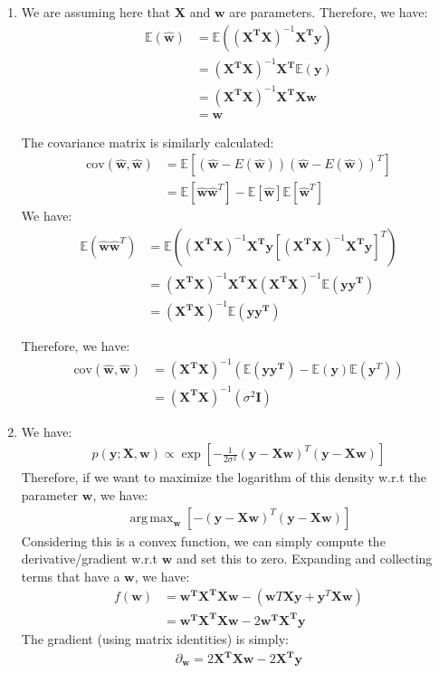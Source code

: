 \documentclass[submit]{harvardml}
\newcommand{\E}{\mathbb{E}}
\newcommand{\cov}{\text{cov}}
\renewcommand{\v}{\boldsymbol}
\DeclareMathOperator*{\argmax}{arg\,max}
\begin{document}
\begin{enumerate}[label=(\alph*)]
	\item We are assuming here that $\v{X}$ and $\v{w}$ are parameters. Therefore, we have:
		\begin{align*}
			\E(\v{\hat w}) &= \E(\v{(X^T X)}^{-1} \v{X^T y}) \\
							&= \v{(X^T X)}^{-1} \v{X^T} \E(\v{y}) \\
							&= \v{(X^T X)}^{-1} \v{X^T X} \v{w} \\
							&= \v{w}
		\end{align*}
		
		The covariance matrix is similarly calculated:
		\begin{align}
			\label{eq:cov}
			\cov( \v{\hat w},  \v{\hat w}) &= \E \left[ ( \v{\hat w} - E( \v{\hat w})) ( \v{\hat w} - E( \v{\hat w}))^T\right] \\
			&= \E \left[ \v{\hat w} \v{\hat w}^T \right] - \E \left[\v{\hat w}\right ] \E \left[ \v{\hat w}^T \right]
		\end{align}
		We have:
		\begin{align*}
			\E (\v{\hat w} \v{\hat w}^T) &= \E \left(\v{(X^T X)}^{-1} \v{X^T y} \left [ \v{(X^T X)}^{-1} \v{X^T y} \right]^T \right) \\
			&= \v{(X^T X)}^{-1} \v{X^T} \v{X} \v{(X^T X)}^{-1} \E(\v{y y^T}) \\
			&= \v{(X^T X)}^{-1} \E( \v{y} \v{y^T})
		\end{align*}
		
		Therefore, we have:
		\begin{align}
			\cov( \v{\hat w},  \v{\hat w}) &= \v{(X^T X)}^{-1} \left(\E( \v{y} \v{y^T}) - \E(\v{y}) \E(\v{y}^T) \right) \\
			&= \v{(X^T X)}^{-1} (\sigma^2 \v{I})
		\end{align}
	
	\item We have:
		\begin{align*}
			p(\v{y}; \v{X}, \v{w})  \propto \exp \left[ -\frac{1}{2 \sigma^2} (\v{y} - \v{X} \v{w})^T (\v{y} - \v{X} \v{w}) \right]
		\end{align*}
		Therefore, if we want to maximize the logarithm of this density w.r.t the parameter $\v{w}$, we have:
		\begin{align*}
			\argmax_{\v{w}} \left[ -(\v{y} - \v{X} \v{w})^T (\v{y} - \v{X} \v{w}) \right]
		\end{align*}
		Considering this is a convex function, we can simply compute the derivative/gradient w.r.t $\v{w}$ and set this to zero. Expanding and collecting terms that have a $\v{w}$, we have:
		\begin{align*}
			f(\v{w}) &= \v{w^T} \v{X^T} \v{X} \v{w} - (\v{w}T \v{X} \v{y} + \v{y}^T \v{X} \v{w}) \\
				&= \v{w^T} \v{X^T} \v{X} \v{w} - 2 \v{w^T} \v{X^T} \v{y}
		\end{align*}
		The gradient (using matrix identities) is simply:
		\begin{align}
			\partial_{\v{w}} = 2 \v{X^T X} \v{w} - 2\v{X^T}\v{y}
		\end{align}
		

\end{enumerate}
\end{document}
